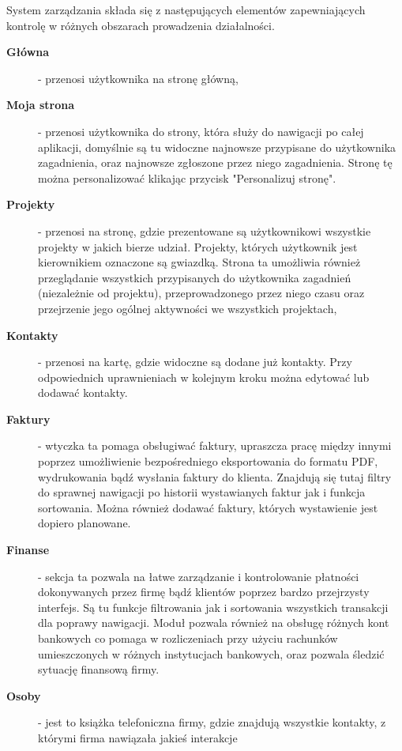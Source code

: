 	\par System zarządzania składa się z następujących elementów zapewniających kontrolę w różnych obszarach prowadzenia działalności.
		
	\begin{description}
		\item[\textbf{Główna}] - przenosi użytkownika na stronę główną,
	
		\item[\textbf{Moja strona}] - przenosi użytkownika do strony, która służy do nawigacji po całej aplikacji, domyślnie są tu widoczne najnowsze przypisane do użytkownika zagadnienia, oraz najnowsze zgłoszone przez niego zagadnienia. Stronę tę można personalizować klikając przycisk "Personalizuj stronę".
					
		\item[\textbf{Projekty}] - przenosi na stronę, gdzie prezentowane są użytkownikowi wszystkie projekty w jakich bierze udział. Projekty, których użytkownik jest kierownikiem oznaczone są gwiazdką. Strona ta umożliwia również przeglądanie wszystkich przypisanych do użytkownika zagadnień (niezależnie od projektu), przeprowadzonego przez niego czasu oraz przejrzenie jego ogólnej aktywności we wszystkich projektach,
					
		\item[\textbf{Kontakty}] - przenosi na kartę, gdzie widoczne są dodane już kontakty. Przy odpowiednich uprawnieniach w kolejnym kroku można edytować lub dodawać kontakty.
					
		\item[\textbf{Faktury}] - wtyczka ta pomaga obsługiwać faktury, upraszcza pracę między innymi poprzez umożliwienie bezpośredniego eksportowania do formatu PDF, wydrukowania bądź wysłania faktury do klienta. Znajdują się tutaj filtry do sprawnej nawigacji po historii wystawianych faktur jak i funkcja sortowania. Można również dodawać faktury, których wystawienie jest dopiero planowane.
					
		\item[\textbf{Finanse}] - sekcja ta pozwala na łatwe zarządzanie i kontrolowanie płatności dokonywanych przez firmę bądź klientów poprzez bardzo przejrzysty interfejs. Są tu funkcje filtrowania jak i sortowania wszystkich transakcji dla poprawy nawigacji. Moduł pozwala również na obsługę różnych kont bankowych co pomaga w rozliczeniach przy użyciu rachunków umieszczonych w różnych instytucjach bankowych, oraz pozwala śledzić sytuację finansową firmy.
					
		\item[\textbf{Osoby}] - jest to książka telefoniczna firmy, gdzie znajdują wszystkie kontakty, z którymi firma nawiązała jakieś interakcje
					

\end{description}

